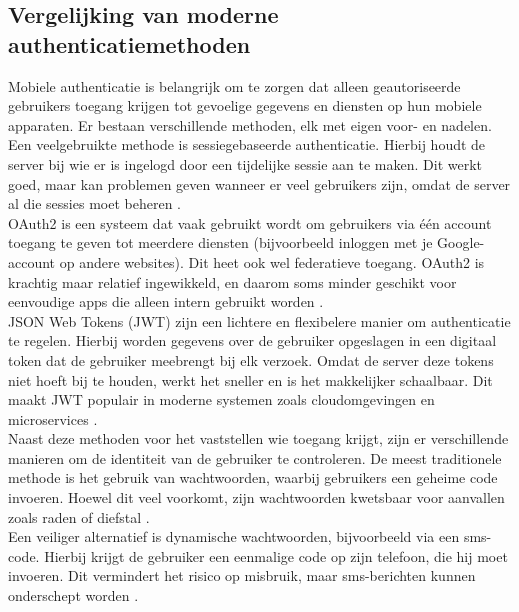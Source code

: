 \subsection{Vergelijking van moderne authenticatiemethoden}

Mobiele authenticatie is belangrijk om te zorgen dat alleen geautoriseerde gebruikers toegang krijgen tot gevoelige gegevens en diensten op hun mobiele apparaten. Er bestaan verschillende methoden, elk met eigen voor- en nadelen.\\

Een veelgebruikte methode is sessiegebaseerde authenticatie. Hierbij houdt de server bij wie er is ingelogd door een tijdelijke sessie aan te maken. Dit werkt goed, maar kan problemen geven wanneer er veel gebruikers zijn, omdat de server al die sessies moet beheren \autocite{Gao2023}.\\

OAuth2 is een systeem dat vaak gebruikt wordt om gebruikers via één account toegang te geven tot meerdere diensten (bijvoorbeeld inloggen met je Google-account op andere websites). Dit heet ook wel federatieve toegang. OAuth2 is krachtig maar relatief ingewikkeld, en daarom soms minder geschikt voor eenvoudige apps die alleen intern gebruikt worden \autocite{Gao2023}.\\

JSON Web Tokens (JWT) zijn een lichtere en flexibelere manier om authenticatie te regelen. Hierbij worden gegevens over de gebruiker opgeslagen in een digitaal token dat de gebruiker meebrengt bij elk verzoek. Omdat de server deze tokens niet hoeft bij te houden, werkt het sneller en is het makkelijker schaalbaar. Dit maakt JWT populair in moderne systemen zoals cloudomgevingen en microservices \autocite{Gao2023}.\\

Naast deze methoden voor het vaststellen wie toegang krijgt, zijn er verschillende manieren om de identiteit van de gebruiker te controleren. De meest traditionele methode is het gebruik van wachtwoorden, waarbij gebruikers een geheime code invoeren. Hoewel dit veel voorkomt, zijn wachtwoorden kwetsbaar voor aanvallen zoals raden of diefstal \autocite{Zukarnain2022}.\\

Een veiliger alternatief is dynamische wachtwoorden, bijvoorbeeld via een sms-code. Hierbij krijgt de gebruiker een eenmalige code op zijn telefoon, die hij moet invoeren. Dit vermindert het risico op misbruik, maar sms-berichten kunnen onderschept worden \autocite{Zukarnain2022}.\\

